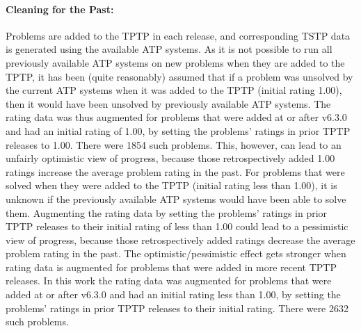 \documentclass[runningheads]{llncs}
\begin{document}
\paragraph{Cleaning for the Past:}
Problems are added to the TPTP in each release, and corresponding TSTP data is generated using 
the available ATP systems.
As it is not possible to run all previously available ATP systems on new problems when they 
are added to the TPTP, it has been (quite reasonably) assumed that if a problem was unsolved by the 
current ATP systems when it was added to the TPTP (initial rating 1.00), then it would have been 
unsolved by previously available ATP systems.
The rating data was thus augmented for problems that were added at or after v6.3.0 and had an
initial rating of 1.00, by setting the problems' ratings in prior TPTP releases to 1.00.
There were 1854 such problems.
This, however, can lead to an unfairly optimistic view of progress, because those retrospectively 
added 1.00 ratings increase the average problem rating in the past.
For problems that were solved when they were added to the TPTP (initial rating less than 1.00),
it is unknown if the previously available ATP systems would have been able to solve them.
Augmenting the rating data by setting the problems' ratings in prior TPTP releases to their 
initial rating of less than 1.00 could lead to a pessimistic view of progress, because those 
retrospectively added ratings decrease the average problem rating in the past.
The optimistic/pessimistic effect gets stronger when rating data is augmented for problems that
were added in more recent TPTP releases.
In this work the rating data was augmented for problems that were added at or after v6.3.0 and 
had an initial rating less than 1.00, by setting the problems' ratings in prior TPTP releases 
to their initial rating.
There were 2632 such problems.

\vspace*{-0.5em}
\end{document}
